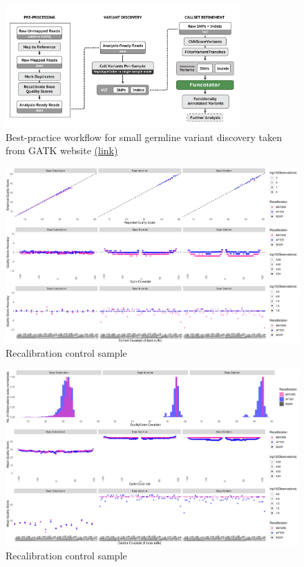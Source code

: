 \documentclass[11pt]{article}
\begin{document}
\begin{figure}[h]
   \centering
   \includegraphics[width=0.8\textwidth]{images/variant_calling_pipeline.png}
   \caption{\footnotesize{Best-practice workflow for small germline variant discovery taken from GATK website \href{https://gatk.broadinstitute.org/hc/en-us/articles/360035535932}{(link)} }}
   \label{pipeline_germline_variant}
\end{figure}


\begin{figure}[h]
   \centering
   \includegraphics[width=\textwidth]{images/recal_control_1_setup1.png}
   \caption{\footnotesize{Recalibration control sample}}
   \label{recal_control_1}
\end{figure}

\begin{figure}[h]
   \centering
   \includegraphics[width=\textwidth]{images/recal_control_2_setup1.png}
   \caption{\footnotesize{Recalibration control sample}}
   \label{recal_control_2}
\end{figure}
\end{document}
